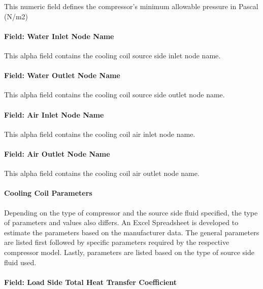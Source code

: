 This numeric field defines the compressor's minimum allowable pressure in Pascal (N/m2)

\paragraph{Field: Water Inlet Node Name}\label{field-water-inlet-node-name-5-000}

This alpha field contains the cooling coil source side inlet node name.

\paragraph{Field: Water Outlet Node Name}\label{field-water-outlet-node-name-5-000}

This alpha field contains the cooling coil source side outlet node name.

\paragraph{Field: Air Inlet Node Name}\label{field-air-inlet-node-name-16}

This alpha field contains the cooling coil air inlet node name.

\paragraph{Field: Air Outlet Node Name}\label{field-air-outlet-node-name-16}

This alpha field contains the cooling coil air outlet node name.

\paragraph{Cooling Coil Parameters}\label{cooling-coil-parameters}

Depending on the type of compressor and the source side fluid specified, the type of parameters and values also differs. An Excel Spreadsheet is developed to estimate the parameters based on the manufacturer data. The general parameters are listed first followed by specific parameters required by the respective compressor model. Lastly, parameters are listed based on the type of source side fluid used.

\paragraph{Field: Load Side Total Heat Transfer Coefficient}\label{field-load-side-total-heat-transfer-coefficient}

